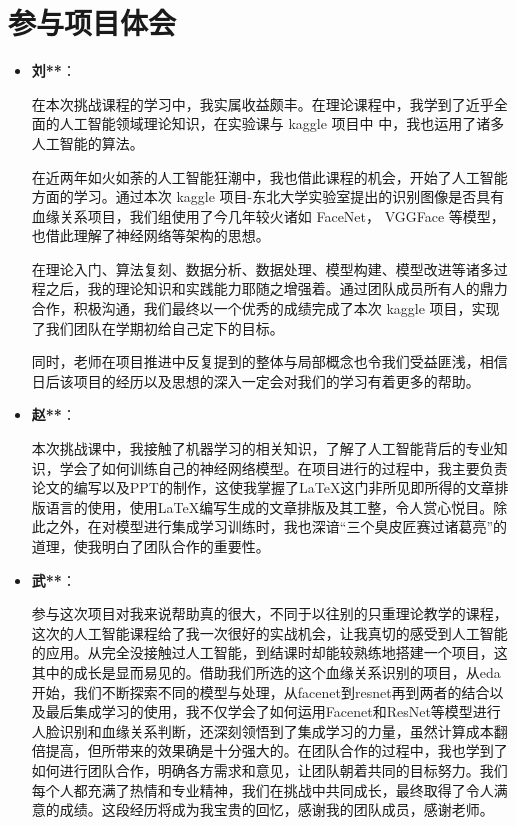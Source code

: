 \documentclass[UTF8]{ctexart}
\begin{document}
\section{参与项目体会}
\begin{itemize}
  \item \textbf{刘**}：
  
  在本次挑战课程的学习中，我实属收益颇丰。在理论课程中，我学到了近乎全面的人工智能领域理论知识，在实验课与 kaggle 项目中 中，我也运用了诸多人工智能的算法。

  在近两年如火如荼的人工智能狂潮中，我也借此课程的机会，开始了人工智能方面的学习。通过本次 kaggle 项目-东北大学实验室提出的识别图像是否具有血缘关系项目，我们组使用了今几年较火诸如 FaceNet，   VGGFace 等模型，也借此理解了神经网络等架构的思想。

  在理论入门、算法复刻、数据分析、数据处理、模型构建、模型改进等诸多过程之后，我的理论知识和实践能力耶随之增强着。通过团队成员所有人的鼎力合作，积极沟通，我们最终以一个优秀的成绩完成了本次 kaggle 项目，实现了我们团队在学期初给自己定下的目标。
  
  同时，老师在项目推进中反复提到的整体与局部概念也令我们受益匪浅，相信日后该项目的经历以及思想的深入一定会对我们的学习有着更多的帮助。
  \item \textbf{赵**}：
  
  本次挑战课中，我接触了机器学习的相关知识，了解了人工智能背后的专业知识，学会了如何训练自己的神经网络模型。在项目进行的过程中，我主要负责论文的编写以及PPT的制作，这使我掌握了\LaTeX 这门非所见即所得的文章排版语言的使用，使用\LaTeX 编写生成的文章排版及其工整，令人赏心悦目。除此之外，在对模型进行集成学习训练时，我也深谙“三个臭皮匠赛过诸葛亮”的道理，使我明白了团队合作的重要性。
  \item \textbf{武**}：
  
  参与这次项目对我来说帮助真的很大，不同于以往别的只重理论教学的课程，这次的人工智能课程给了我一次很好的实战机会，让我真切的感受到人工智能的应用。从完全没接触过人工智能，到结课时却能较熟练地搭建一个项目，这其中的成长是显而易见的。借助我们所选的这个血缘关系识别的项目，从eda开始，我们不断探索不同的模型与处理，从facenet到resnet再到两者的结合以及最后集成学习的使用，我不仅学会了如何运用Facenet和ResNet等模型进行人脸识别和血缘关系判断，还深刻领悟到了集成学习的力量，虽然计算成本翻倍提高，但所带来的效果确是十分强大的。在团队合作的过程中，我也学到了如何进行团队合作，明确各方需求和意见，让团队朝着共同的目标努力。我们每个人都充满了热情和专业精神，我们在挑战中共同成长，最终取得了令人满意的成绩。这段经历将成为我宝贵的回忆，感谢我的团队成员，感谢老师。
  \end{itemize}
\end{document}
